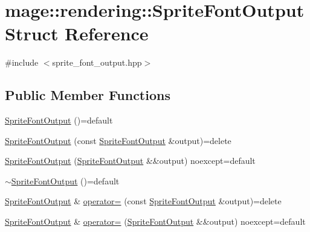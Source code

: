 \hypertarget{structmage_1_1rendering_1_1_sprite_font_output}{}\section{mage\+:\+:rendering\+:\+:Sprite\+Font\+Output Struct Reference}
\label{structmage_1_1rendering_1_1_sprite_font_output}


{\ttfamily \#include $<$sprite\+\_\+font\+\_\+output.\+hpp$>$}

\subsection*{Public Member Functions}
\begin{DoxyCompactItemize}
\item 
\mbox{\hyperlink{structmage_1_1rendering_1_1_sprite_font_output_a5bc62257f436c6836a8fd0b3c306c026}{Sprite\+Font\+Output}} ()=default
\item 
\mbox{\hyperlink{structmage_1_1rendering_1_1_sprite_font_output_a304a4627f0aaacdb0f9dd0951421c8a2}{Sprite\+Font\+Output}} (const \mbox{\hyperlink{structmage_1_1rendering_1_1_sprite_font_output}{Sprite\+Font\+Output}} \&output)=delete
\item 
\mbox{\hyperlink{structmage_1_1rendering_1_1_sprite_font_output_a19714991b6c2e2aa842022b5c7e281cb}{Sprite\+Font\+Output}} (\mbox{\hyperlink{structmage_1_1rendering_1_1_sprite_font_output}{Sprite\+Font\+Output}} \&\&output) noexcept=default
\item 
\mbox{\hyperlink{structmage_1_1rendering_1_1_sprite_font_output_ac271cd1aa65291b2403555b8c230b702}{$\sim$\+Sprite\+Font\+Output}} ()=default
\item 
\mbox{\hyperlink{structmage_1_1rendering_1_1_sprite_font_output}{Sprite\+Font\+Output}} \& \mbox{\hyperlink{structmage_1_1rendering_1_1_sprite_font_output_a0b94e62b46d2b75d05eff13f8909f1cc}{operator=}} (const \mbox{\hyperlink{structmage_1_1rendering_1_1_sprite_font_output}{Sprite\+Font\+Output}} \&output)=delete
\item 
\mbox{\hyperlink{structmage_1_1rendering_1_1_sprite_font_output}{Sprite\+Font\+Output}} \& \mbox{\hyperlink{structmage_1_1rendering_1_1_sprite_font_output_aff107541c1b9a0fb3052a6ed0dbae7dd}{operator=}} (\mbox{\hyperlink{structmage_1_1rendering_1_1_sprite_font_output}{Sprite\+Font\+Output}} \&\&output) noexcept=default
\end{DoxyCompactItemize}
